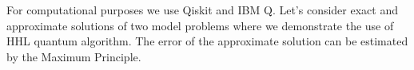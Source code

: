 \documentclass[review]{elsarticle}
\begin{document}


For computational purposes we use Qiskit and IBM Q. Let's consider exact and approximate solutions of two model problems where we demonstrate the use of HHL quantum algorithm. The error of the approximate solution can be estimated by the Maximum Principle.\\
\end{document}
